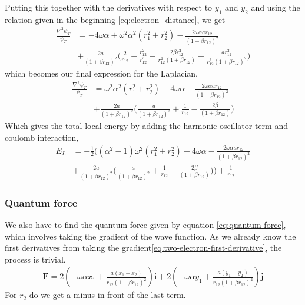 \documentclass[11pt]{article}
\begin{document}
Putting this together with the derivatives with respect to $y_1$ and $y_2$ and using the relation given in the beginning \eqref{eq:electron_distance}, we get
\begin{align*}
	\frac{\nabla^2 \psi_T}{\psi_T} &= - 4\omega \alpha + \omega^2 \alpha ^2(r_1^2 + r_2^2) - \frac{2\omega\alpha a r_{12}}{(1+\beta r_{12})^2} \\
	&+ \frac{2a}{(1+\beta r_{12})^2}\bigg( \frac{2}{r_{12}} - \frac{r_{12}^2}{r_{12}^3} - \frac{2\beta r_{12}^2}{r_{12}^2(1+ \beta r_{12})} + \frac{a r_{12}^2}{r_{12}^2(1+\beta r_{12})^2}\bigg)
\end{align*}
which becomes our final expression for the Laplacian,
\begin{align}
	\frac{\nabla^2 \psi_T}{\psi_T} &= \omega^2 \alpha ^2(r_1^2 + r_2^2) - 4\omega \alpha - \frac{2\omega\alpha a r_{12}}{(1+\beta r_{12})^2} \\
	&+ \frac{2a}{(1+\beta r_{12})^2}\bigg(\frac{a }{(1+\beta r_{12})^2} + \frac{1}{r_{12}} - \frac{2\beta}{(1+ \beta r_{12})} \bigg)
	\label{eq:two-electron-laplacian}
\end{align}
Which gives the total local energy by adding the harmonic oscillator term and coulomb interaction,
\begin{align}
	E_L &= -\frac{1}{2}\bigg((\alpha ^2-1)\omega^2(r_1^2 + r_2^2) - 4\omega \alpha - \frac{2\omega\alpha a r_{12}}{(1+\beta r_{12})^2} \\
	&+ \frac{2a}{(1+\beta r_{12})^2}\bigg(\frac{a }{(1+\beta r_{12})^2} + \frac{1}{r_{12}} - \frac{2\beta}{(1+ \beta r_{12})} \bigg)\bigg) + \frac{1}{r_{12}}
	\label{eq:two-electron-local-energy}
\end{align}

\subsubsection{Quantum force}
We also have to find the quantum force given by equation \eqref{eq:quantum-force}, which involves taking the gradient of the wave function. As we already know the first derivatives from taking the gradient\eqref{eq:two-electron-first-derivative}, the process is trivial.
\begin{align}
	\mathbf{F} = 2\left(-\omega\alpha x_1 + \frac{a(x_1-x_2)}{r_{12}(1+\beta r_{12})^2} \right)\mathbf{i} + 2\left(-\omega\alpha y_1 + \frac{a(y_1-y_2)}{r_{12}(1+\beta r_{12})^2} \right)\mathbf{j}
	\label{eq:two-electron-quantum-force}
\end{align}
For $r_2$ do we get a minus in front of the last term.
\end{document}
